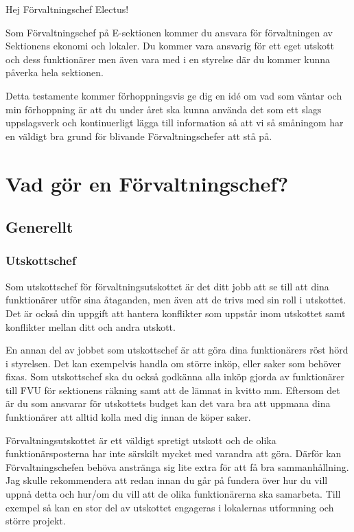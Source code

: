 \documentclass[10pt]{article}
\begin{document}
\heading{\doctitle}

Hej Förvaltningschef Electus!

Som Förvaltningschef på E-sektionen kommer du ansvara för förvaltningen av Sektionens ekonomi och lokaler. Du kommer vara ansvarig för ett eget utskott och dess funktionärer men även vara med i en styrelse där du kommer kunna påverka hela sektionen.

Detta testamente kommer förhoppningsvis ge dig en idé om vad som väntar och min förhoppning är att du under året ska kunna använda det som ett slags uppslagsverk och kontinuerligt lägga till information så att vi så småningom har en väldigt bra grund för blivande Förvaltningschefer att stå på.

\newpage

\tableofcontents
\newpage


\section{Vad gör en Förvaltningschef?}
\subsection{Generellt}
\subsubsection{Utskottschef}
Som utskottschef för förvaltningsutskottet är det ditt jobb att se till att dina funktionärer utför sina åtaganden, men även att de trivs med sin roll i utskottet. Det är också din uppgift att hantera konflikter som uppstår inom utskottet samt konflikter mellan ditt och andra utskott.

En annan del av jobbet som utskottschef är att göra dina funktionärers röst hörd i styrelsen. Det kan exempelvis handla om större inköp, eller saker som behöver fixas.
Som utskottschef ska du också godkänna alla inköp gjorda av funktionärer till FVU för sektionens räkning samt att de lämnat in kvitto mm. Eftersom det är du som ansvarar för utskottets budget kan det vara bra att uppmana dina funktionärer att alltid kolla med dig innan de köper saker.

Förvaltningsutskottet är ett väldigt spretigt utskott och de olika funktionärsposterna har inte särskilt mycket med varandra att göra. Därför kan Förvaltningschefen behöva anstränga sig lite extra för att få bra sammanhållning. Jag skulle rekommendera att redan innan du går på fundera över hur du vill uppnå detta och hur/om du vill att de olika funktionärerna ska samarbeta. Till exempel så kan en stor del av utskottet engageras i lokalernas utformning och större projekt.
\end{document}
